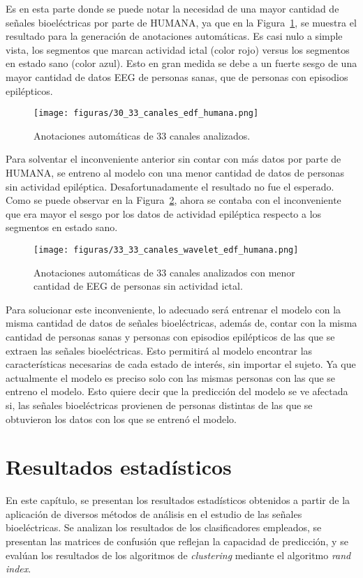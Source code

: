 Es en esta parte donde se puede notar la necesidad de una mayor cantidad de señales bioeléctricas por parte de HUMANA, ya que en la Figura~\ref{fig: 33_chn_grafica}, se muestra el resultado para la generación de anotaciones automáticas. Es casi nulo a simple vista, los segmentos que marcan actividad ictal (color rojo) versus los segmentos en estado sano (color azul). Esto en gran medida se debe a un fuerte sesgo de una mayor cantidad de datos EEG de personas sanas, que de personas con episodios epilépticos. 

\begin{figure}[H]
    \centering
    \texttt{[image: figuras/30\_33\_canales\_edf\_humana.png]}
    \caption{Anotaciones automáticas de 33 canales analizados.}
    \label{fig: 33_chn_grafica}
\end{figure}

Para solventar el inconveniente anterior sin contar con más datos por parte de HUMANA, se entreno al modelo con una menor cantidad de datos de personas sin actividad epiléptica. Desafortunadamente el resultado no fue el esperado. Como se puede observar en la Figura~\ref{fig: 33_chn_grafica_menos}, ahora se contaba con el inconveniente que era mayor el sesgo por los datos de actividad epiléptica respecto a los segmentos en estado sano.

\begin{figure}[H]
    \centering
    \texttt{[image: figuras/33\_33\_canales\_wavelet\_edf\_humana.png]}
    \caption{Anotaciones automáticas de 33 canales analizados con menor cantidad de EEG de personas sin actividad ictal.}
    \label{fig: 33_chn_grafica_menos}
\end{figure}

Para solucionar este inconveniente, lo adecuado será entrenar el modelo con la misma cantidad de datos de señales bioeléctricas, además de, contar con la misma cantidad de personas sanas y personas con episodios epilépticos de las que se extraen las señales bioeléctricas. Esto permitirá al modelo encontrar las características necesarias de cada estado de interés, sin importar el sujeto. Ya que actualmente el modelo es preciso solo con las mismas personas con las que se entreno el modelo. Esto quiere decir que la predicción del modelo se ve afectada si, las señales bioeléctricas provienen de personas distintas de las que se obtuvieron los datos con los que se entrenó el modelo. 

\chapter{Resultados estadísticos}
En este capítulo, se presentan los resultados estadísticos obtenidos a partir de la aplicación de diversos métodos de análisis en el estudio de las señales bioeléctricas. Se analizan los resultados de los clasificadores empleados, se presentan las matrices de confusión que reflejan la capacidad de predicción, y se evalúan los resultados de los algoritmos de \textit{clustering} mediante el algoritmo \textit{rand index}.

